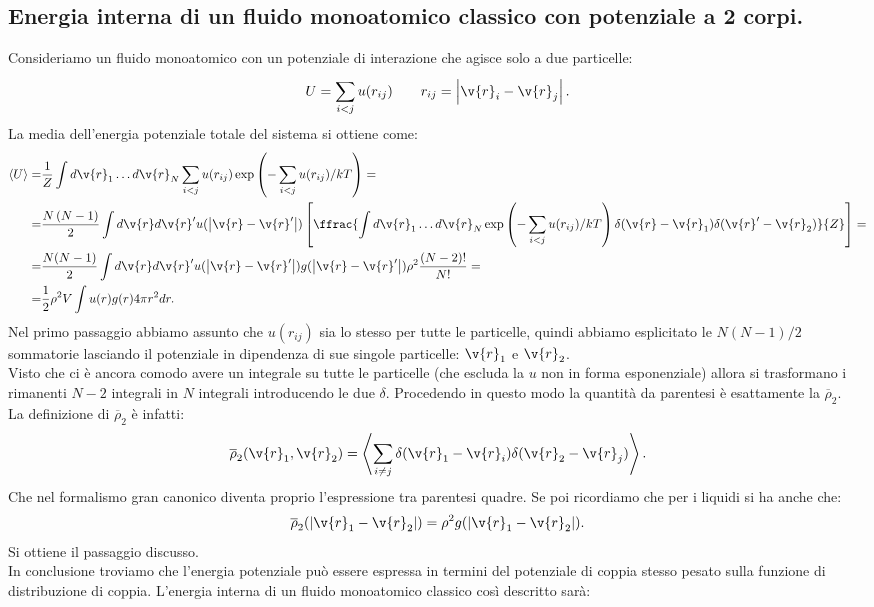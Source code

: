 \subsection{Energia interna di un fluido monoatomico classico con potenziale a 2 corpi.}
\label{subsec:Energia interna di un fluido monoatomico classico con potenziale a 2 corpi.}
Consideriamo un fluido monoatomico con un potenziale di interazione che agisce solo a due particelle:
\[
	U = \sum_{i<j}^{} u(r_{ij}) \quad \quad  r_{ij} = \left| \v{r}_i - \v{r}_j \right| 
.\] 
La media dell'energia potenziale totale del sistema si ottiene come:
\[\begin{aligned}
	\left<U \right> 
	=&
	\frac{1}{Z}\int d \v{r}_1\ldots d \v{r}_N 
	\sum_{i<j}^{} u(r_{ij})
	\exp\left( -\sum_{i<j}^{} u(r_{ij})/kT \right) =\\
	=&
	\frac{N\left( N-1 \right) }{2} 
	\int d \v{r}d \v{r}' u(\left|\v{r}-\v{r}'\right|)
	\left[ 
	\ffrac{
	\int d\v{r}_1\ldots d\v{r}_N
	\exp\left(-\sum_{i<j}^{} u(r_{ij})/kT\right) 
	\delta(\v{r}-\v{r}_1)\delta(\v{r}'-\v{r}_2)
	}{Z} \right] =\\
	=&
	\frac{N(N-1)}{2} \int d \v{r} d \v{r}' u(\left| \v{r}-\v{r}' \right|)
	g(\left| \v{r}-\v{r}' \right|)\rho ^2\frac{\left( N-2 \right)!}{N!} =\\
	=&
	\frac{1}{2} \rho ^2 V \int u(r)g(r)4\pi r^2 dr
.\end{aligned}\]
Nel primo passaggio abbiamo assunto che $u(r_{ij})$ sia lo stesso per tutte le particelle, quindi abbiamo esplicitato le $N(N-1) /2$ sommatorie lasciando il potenziale in dipendenza di sue singole particelle: $\v{r}_1$ e $\v{r}_2$. \\
Visto che ci è ancora comodo avere un integrale su tutte le particelle (che escluda la $u$ non in forma esponenziale) allora si trasformano i rimanenti $N-2$ integrali in $N$ integrali introducendo le due $\delta$. Procedendo in questo modo la quantità da parentesi è esattamente la $\overline{\rho}_2$.\\
La definizione di $\overline{\rho}_2$ è infatti:
\[
	\overline{\rho }_2(\v{r}_1,\v{r}_2) 
	= 
	\left< \sum_{i\neq j}^{} \delta(\v{r}_1 -\v{r}_i)\delta(\v{r}_2 - \v{r}_j) \right>
.\] 
Che nel formalismo gran canonico diventa proprio l'espressione tra parentesi quadre. Se poi ricordiamo che per i liquidi si ha anche che:
\[
	\overline{\rho }_2(\left| \v{r}_1 -\v{r}_2 \right| )
	=
	\rho ^2 g(\left| \v{r}_1 - \v{r}_2 \right| )
.\] 
Si ottiene il passaggio discusso.\\
In conclusione troviamo che l'energia potenziale può essere espressa in termini del potenziale di coppia stesso pesato sulla funzione di distribuzione di coppia. L'energia interna di un fluido monoatomico classico così descritto sarà:
